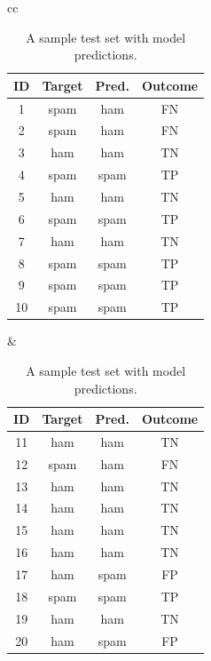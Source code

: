 \documentclass[xcolor={table}]{beamer}
\newcommand{\featN}[1]{\textsc{#1}}
\begin{document}
 \begin{frame} 
\begin{table}[!tb]
\caption{A sample test set with model predictions.}
\label{tab:samplePredictionExample}
\centering
\begin{scriptsize}
\begin{tabular}{cc}
		\hline
			\begin{minipage}{0.45\textwidth}
					\begin{tabular}{ c c c c}
\featN{ID}	 & Target	& Pred. & Outcome\\
\hline
1	&	spam	&	ham	&	FN	\\ 
2	&	spam	&	ham	&	FN	\\
3	&	ham	&	ham	&	TN	\\
4	&	spam	&	spam	&	TP	\\
5	&	ham	&	ham	&	TN	\\
6	&	spam	&	spam	&	TP	\\
7	&	ham	&	ham	&	TN	\\
8	&	spam	&	spam	&	TP	\\
9	&	spam	&	spam	&	TP	\\
10	&	spam	&	spam	&	TP	\\
\hline 
\end{tabular}
			\end{minipage}
			&
			\begin{minipage}{0.45\textwidth}
									\begin{tabular}{ c c c c}
\featN{ID}	 & Target	& Pred. & Outcome\\
\hline
11	&	ham	&	ham	&	TN	\\
12	&	spam	&	ham	&	FN	\\
13	&	ham	&	ham	&	TN	\\
14	&	ham	&	ham	&	TN	\\
15	&	ham	&	ham	&	TN	\\
16	&	ham	&	ham	&	TN	\\
17	&	ham	&	spam	&	FP	\\
18	&	spam	&	spam	&	TP	\\
19	&	ham	&	ham	&	TN	\\
20	&	ham	&	spam	&	FP	\\
\hline 
\end{tabular}
			\end{minipage}\\
\end{tabular}
\end{scriptsize}
\end{table}
\end{frame} 
\end{document}

